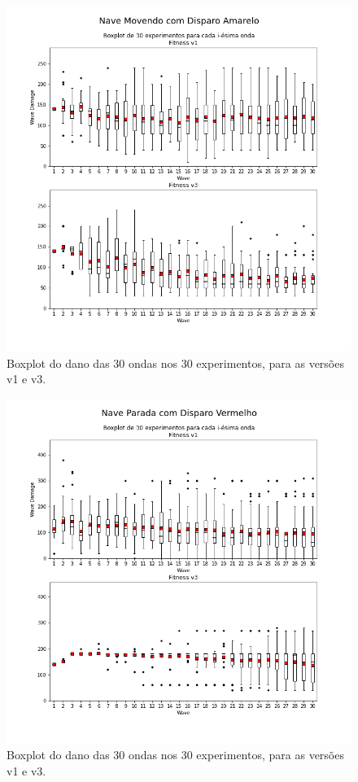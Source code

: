 \begin{figure}
  \centering
  \includegraphics[width=1.1\textwidth]{figuras/ss/boxplot Nave Movendo com Disparo Amarelo.png}
  \caption{Boxplot do dano das 30 ondas nos 30 experimentos, para as versões v1 e v3.}
  \label{fig:ss-box-red}
\end{figure}

\begin{figure}
  \centering
  \includegraphics[width=1.1\textwidth]{figuras/ss/boxplot Nave Parada com Disparo Vermelho.png}
  \caption{Boxplot do dano das 30 ondas nos 30 experimentos, para as versões v1 e v3.}
  \label{ss-box-gr}
\end{figure}

